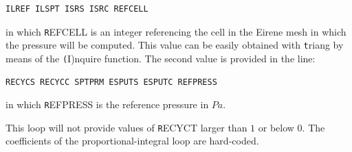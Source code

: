 \begin{verbatim}
ILREF ILSPT ISRS ISRC REFCELL
\end{verbatim}

in which {\texttt REFCELL} is an integer referencing the cell in the Eirene mesh 
in which the pressure will be computed. This value can be easily obtained 
with {\texttt triang} by means of the {\texttt (I)nquire} function. The second 
value is provided in the line:

\begin{verbatim}
RECYCS RECYCC SPTPRM ESPUTS ESPUTC REFPRESS
\end{verbatim}

in which {\texttt REFPRESS} is the reference pressure in $Pa$.

This loop will not provide values of {\texttt RECYCT} larger than $1$ or below $0$.
The coefficients of the proportional-integral loop are hard-coded.
